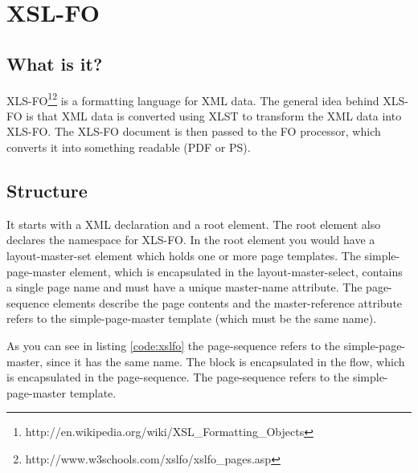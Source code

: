 \chapter{XSL-FO}
\label{chap:xsl-fo}

\section{What is it?}

XLS-FO\footnote{http://en.wikipedia.org/wiki/XSL\_Formatting\_Objects}\footnote{http://www.w3schools.com/xslfo/xslfo\_pages.asp} is a formatting language for XML data. The general idea behind XLS-FO is that XML data is converted using XLST to transform the XML data into XLS-FO. The XLS-FO document is then passed to the FO processor, which converts it into something readable (PDF or PS). 

\section{Structure}

It starts with a XML declaration and a root element. The root element also declares the namespace for XLS-FO. In the root element you would have a layout-master-set element which holds one or more page templates. The simple-page-master element, which is encapsulated in the layout-master-select, contains a single page name and must have a unique master-name attribute. The page-sequence elements describe the page contents and the master-reference attribute refers to the simple-page-master template (which must be the same name). 

    

As you can see in listing \ref{code:xslfo} the page-sequence refers to the simple-page-master, since it has the same name. The block is encapsulated in the flow, which is encapsulated in the page-sequence. The page-sequence refers to the simple-page-master template.